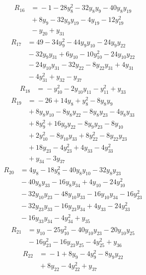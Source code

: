 \begin{align*}
R_{16} &={} -1 -28y_{8}^{2} -32y_{8}y_{9} -40y_{8}y_{19} \\
 &{} +8y_{9} -32y_{9}y_{19} -4y_{19} -12y_{19}^{2} \\
 &{} -y_{20} +y_{31}
\end{align*}
\begin{align*}
R_{17} &={} 49 -34y_{9}^{2} -44y_{9}y_{10} -24y_{9}y_{22} \\
 &{} -32y_{9}y_{31} +6y_{10} -10y_{10}^{2} -24y_{10}y_{22} \\
 &{} -24y_{10}y_{31} -32y_{22} -8y_{22}y_{31} +4y_{31} \\
 &{} -4y_{31}^{2} +y_{32} -y_{37}
\end{align*}
\begin{align*}
R_{18} &={} -y_{10}^{2} -2y_{10}y_{11} -y_{11}^{2} +y_{33}
\end{align*}
\begin{align*}
R_{19} &={} -26 +14y_{8} +y_{8}^{2} -8y_{8}y_{9} \\
 &{} +8y_{8}y_{10} -8y_{8}y_{22} -8y_{8}y_{23} -4y_{8}y_{33} \\
 &{} +8y_{9}^{2} +16y_{9}y_{22} -8y_{9}y_{23} -8y_{10} \\
 &{} +2y_{10}^{2} -8y_{10}y_{33} +8y_{22}^{2} -8y_{22}y_{23} \\
 &{} +18y_{23} -4y_{23}^{2} +4y_{33} -4y_{33}^{2} \\
 &{} +y_{34} -3y_{37}
\end{align*}
\begin{align*}
R_{20} &={} 4y_{8} -18y_{8}^{2} -40y_{8}y_{10} -32y_{8}y_{23} \\
 &{} -40y_{8}y_{33} -16y_{8}y_{34} +4y_{10} -24y_{10}^{2} \\
 &{} -32y_{10}y_{23} -48y_{10}y_{33} -16y_{10}y_{34} -16y_{23}^{2} \\
 &{} -32y_{23}y_{33} -16y_{23}y_{34} +4y_{33} -24y_{33}^{2} \\
 &{} -16y_{33}y_{34} -4y_{34}^{2} +y_{35}
\end{align*}
\begin{align*}
R_{21} &={} y_{10} -25y_{10}^{2} -40y_{10}y_{23} -20y_{10}y_{25} \\
 &{} -16y_{23}^{2} -16y_{23}y_{25} -4y_{25}^{2} +y_{36}
\end{align*}
\begin{align*}
R_{22} &={} -1 +8y_{9} -4y_{9}^{2} -8y_{9}y_{22} \\
 &{} +8y_{22} -4y_{22}^{2} +y_{37}
\end{align*}
